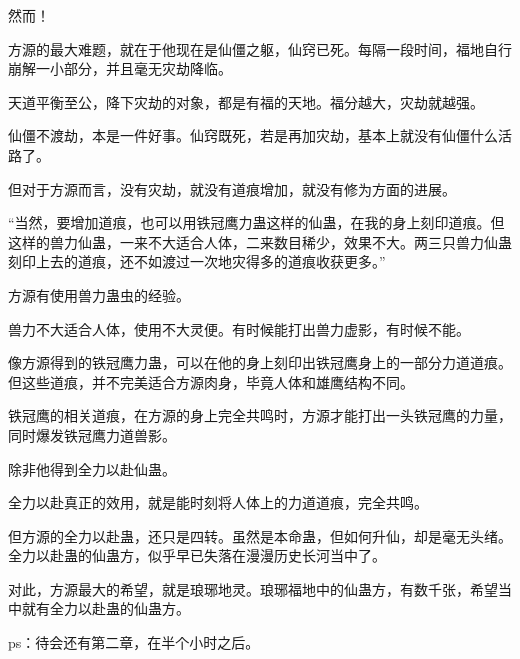 \begin{this_body}
然而！

方源的最大难题，就在于他现在是仙僵之躯，仙窍已死。每隔一段时间，福地自行崩解一小部分，并且毫无灾劫降临。

天道平衡至公，降下灾劫的对象，都是有福的天地。福分越大，灾劫就越强。

仙僵不渡劫，本是一件好事。仙窍既死，若是再加灾劫，基本上就没有仙僵什么活路了。

但对于方源而言，没有灾劫，就没有道痕增加，就没有修为方面的进展。

“当然，要增加道痕，也可以用铁冠鹰力蛊这样的仙蛊，在我的身上刻印道痕。但这样的兽力仙蛊，一来不大适合人体，二来数目稀少，效果不大。两三只兽力仙蛊刻印上去的道痕，还不如渡过一次地灾得多的道痕收获更多。”

方源有使用兽力蛊虫的经验。

兽力不大适合人体，使用不大灵便。有时候能打出兽力虚影，有时候不能。

像方源得到的铁冠鹰力蛊，可以在他的身上刻印出铁冠鹰身上的一部分力道道痕。但这些道痕，并不完美适合方源肉身，毕竟人体和雄鹰结构不同。

铁冠鹰的相关道痕，在方源的身上完全共鸣时，方源才能打出一头铁冠鹰的力量，同时爆发铁冠鹰力道兽影。

除非他得到全力以赴仙蛊。

全力以赴真正的效用，就是能时刻将人体上的力道道痕，完全共鸣。

但方源的全力以赴蛊，还只是四转。虽然是本命蛊，但如何升仙，却是毫无头绪。全力以赴蛊的仙蛊方，似乎早已失落在漫漫历史长河当中了。

对此，方源最大的希望，就是琅琊地灵。琅琊福地中的仙蛊方，有数千张，希望当中就有全力以赴蛊的仙蛊方。

ps：待会还有第二章，在半个小时之后。

\end{this_body}

